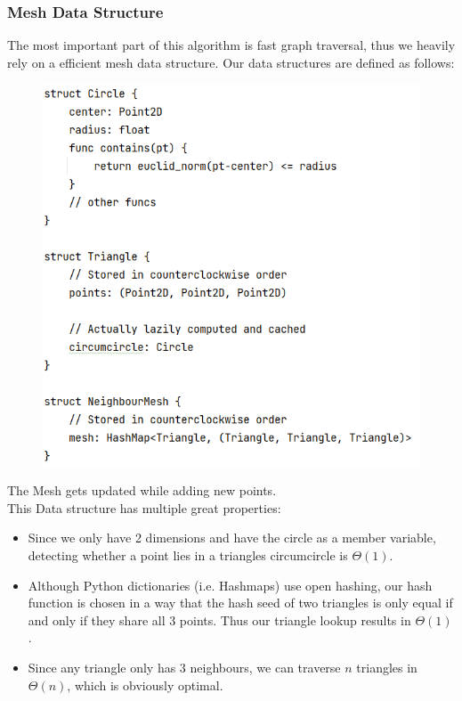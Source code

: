 \subsubsection{Mesh Data Structure}
The most important part of this algorithm is fast graph traversal, thus we heavily rely on a efficient mesh data structure. Our data structures are defined as follows:
\begin{figure}[H]
    \centering
    \includegraphics[width=\textwidth]{ds.png}
\end{figure}
The Mesh gets updated while adding new points.\\
This Data structure has multiple great properties:
\begin{itemize}
    \item Since we only have 2 dimensions and have the circle as a member variable, detecting whether a point lies in a triangles circumcircle is $\Theta(1)$.
    \item Although Python dictionaries (i.e. Hashmaps) use open hashing, our hash function is chosen in a way that the hash seed of two triangles is only equal if and only if they share all 3 points. Thus our triangle lookup results in $\Theta(1)$.
    \item Since any triangle only has 3 neighbours, we can traverse $n$ triangles in $\Theta(n)$, which is obviously optimal.
\end{itemize}
